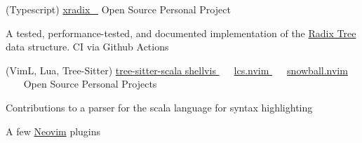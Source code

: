 


\begin{cventries}


\cventry
  {(Typescript)} %
  {\textcolor{darkblue}{\href{https://github.com/stumash/xradix}{xradix \ \faGithubSquare\acvHeaderIconSep} \href{https://stumash.github.io/xradix/}{\faMap}}} %
  {Open Source Personal Project} %
  {} %
  { %
    \begin{cvitems}
    \item {A tested, performance-tested, and documented implementation of the \textcolor{darkblue}{\href{https://en.wikipedia.org/wiki/Radix_tree}{Radix Tree}} data structure. CI via Github Actions }
    \end{cvitems}
  }


\cventry
  {(VimL, Lua, Tree-Sitter)}
  {
    \textcolor{darkblue}{
      \href{https://github.com/tree-sitter/tree-sitter-scala/pulls?q=is\%3Apr+is\%3Aclosed+author\%3Astumash}{tree-sitter-scala \faGithubSquare}
      \href{https://github.com/stumash/shellvis}{shellvis \faGithubSquare}\ \ \
      \href{https://github.com/stumash/lcs.nvim}{lcs.nvim \faGithubSquare}\ \ \
      \href{https://github.com/stumash/snowball.nvim}{snowball.nvim \faGithubSquare}\ \ \
    }
  }
  {Open Source Personal Projects}
  {}
  {
    \begin{cvitems}
    \item {Contributions to a parser for the scala language for syntax highlighting}
    \item {A few \textcolor{darkblue}{\href{https://neovim.io/}{Neovim}} plugins}
    \end{cvitems}
  }



\end{cventries}
